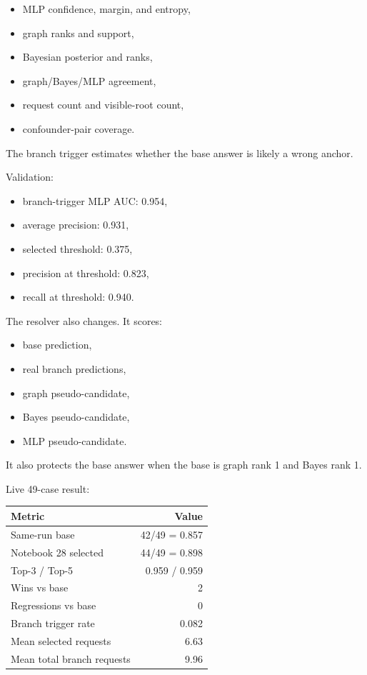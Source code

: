 \documentclass[11pt]{article}
\begin{document}
\begin{itemize}[leftmargin=*]
    \item MLP confidence, margin, and entropy,
    \item graph ranks and support,
    \item Bayesian posterior and ranks,
    \item graph/Bayes/MLP agreement,
    \item request count and visible-root count,
    \item confounder-pair coverage.
\end{itemize}

The branch trigger estimates whether the base answer is likely a wrong anchor.

Validation:

\begin{itemize}[leftmargin=*]
    \item branch-trigger MLP AUC: 0.954,
    \item average precision: 0.931,
    \item selected threshold: 0.375,
    \item precision at threshold: 0.823,
    \item recall at threshold: 0.940.
\end{itemize}

The resolver also changes. It scores:

\begin{itemize}[leftmargin=*]
    \item base prediction,
    \item real branch predictions,
    \item graph pseudo-candidate,
    \item Bayes pseudo-candidate,
    \item MLP pseudo-candidate.
\end{itemize}

It also protects the base answer when the base is graph rank 1 and Bayes rank 1.

Live 49-case result:

\begin{table}[H]
\centering
\begin{tabular}{lr}
\toprule
Metric & Value \\
\midrule
Same-run base & 42/49 = 0.857 \\
Notebook 28 selected & 44/49 = 0.898 \\
Top-3 / Top-5 & 0.959 / 0.959 \\
Wins vs base & 2 \\
Regressions vs base & 0 \\
Branch trigger rate & 0.082 \\
Mean selected requests & 6.63 \\
Mean total branch requests & 9.96 \\
\bottomrule
\end{tabular}
\end{table}
\end{document}
